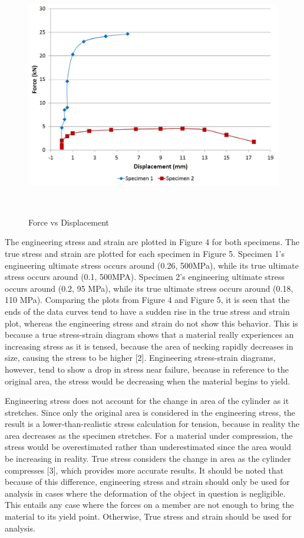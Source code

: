 \documentclass[12pt]{article}
\begin{document}
\begin{figure}[h!]  
  \centering
    \includegraphics[width=\linewidth,height=4.2in]{force_vs_displacement.JPG}
    \caption{Force vs Displacement}
\end{figure}

The engineering stress and strain are plotted in Figure 4 for both specimens. The true stress and strain are plotted for each specimen in Figure 5. Specimen 1's engineering ultimate stress occurs around (0.26, 500MPa), while its true ultimate stress occurs around (0.1, 500MPA). Specimen 2's engineering ultimate stress occurs around (0.2, 95 MPa), while its true ultimate stress occurs around (0.18, 110 MPa). Comparing the plots from Figure 4 and Figure 5, it is seen that the ends of the data curves tend to have a sudden rise in the true stress and strain plot, whereas the engineering stress and strain do not show this behavior. This is because a true stress-strain diagram shows that a material really experiences an increasing stress as it is tensed, because the area of necking rapidly decreases in size, causing the stress to be higher [2]. Engineering stress-strain diagrams, however, tend to show a drop in stress near failure, because in reference to the original area, the stress would be decreasing when the material begins to yield.
\bigskip

Engineering stress does not account for the change in area of the cylinder as it stretches. Since only the original area is considered in the engineering stress, the result is a lower-than-realistic stress calculation for tension, because in reality the area decreases as the specimen stretches. For a material under compression, the stress would be overestimated rather than underestimated since the area would be increasing in reality. True stress considers the change in area as the cylinder compresses [3], which provides more accurate results. It should be noted that because of this difference, engineering stress and strain should only be used for analysis in cases where the deformation of the object in question is negligible. This entails any case where the forces on a member are not enough to bring the material to its yield point. Otherwise, True stress and strain should be used for analysis.
\end{document}
